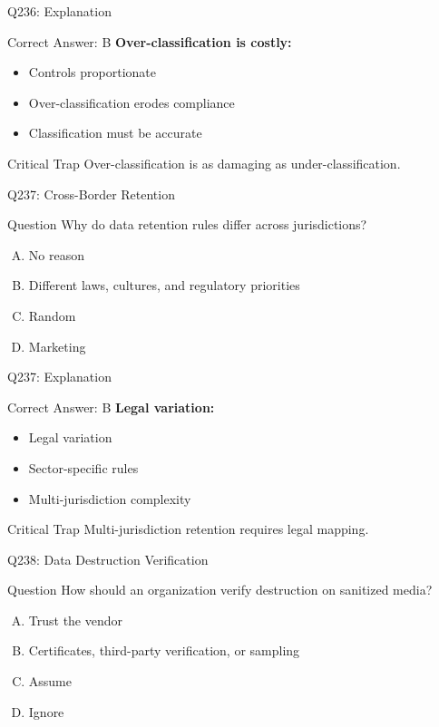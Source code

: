 \documentclass{beamer}
\begin{document}
	\begin{frame}{Q236: Explanation}
		\begin{block}{Correct Answer: B}
			\textbf{Over-classification is costly:}
			\begin{itemize}
				\item Controls proportionate
				\item Over-classification erodes compliance
				\item Classification must be accurate
			\end{itemize}
		\end{block}
		\begin{alertblock}{Critical Trap}
			Over-classification is as damaging as under-classification.
		\end{alertblock}
	\end{frame}
	
	\begin{frame}{Q237: Cross-Border Retention}
		\begin{block}{Question}
			Why do data retention rules differ across jurisdictions?
		\end{block}
		\begin{enumerate}[(A)]
			\item No reason
			\item Different laws, cultures, and regulatory priorities
			\item Random
			\item Marketing
		\end{enumerate}
	\end{frame}
	
	\begin{frame}{Q237: Explanation}
		\begin{block}{Correct Answer: B}
			\textbf{Legal variation:}
			\begin{itemize}
				\item Legal variation
				\item Sector-specific rules
				\item Multi-jurisdiction complexity
			\end{itemize}
		\end{block}
		\begin{alertblock}{Critical Trap}
			Multi-jurisdiction retention requires legal mapping.
		\end{alertblock}
	\end{frame}
	
	\begin{frame}{Q238: Data Destruction Verification}
		\begin{block}{Question}
			How should an organization verify destruction on sanitized media?
		\end{block}
		\begin{enumerate}[(A)]
			\item Trust the vendor
			\item Certificates, third-party verification, or sampling
			\item Assume
			\item Ignore
		\end{enumerate}
	\end{frame}
	
\end{document}
